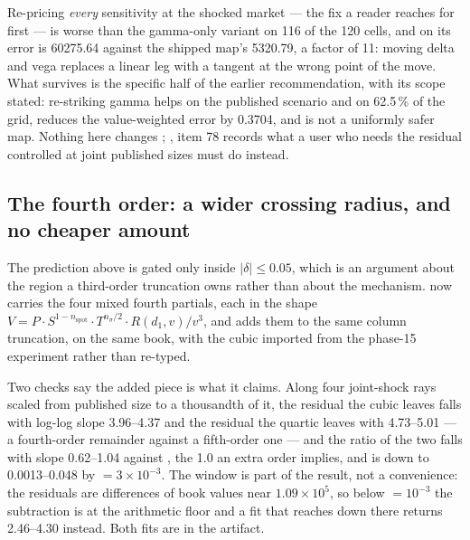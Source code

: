 \documentclass[11pt,a4paper]{article}
\begin{document}
Re-pricing \emph{every} sensitivity at the shocked market --- the fix a reader reaches for first --- is
worse than the gamma-only variant on 116 of the 120 cells, and on  its error is 60275.64
against the shipped map's 5320.79, a factor of 11: moving delta and vega replaces a linear leg with a
tangent at the wrong point of the move. What survives is the specific half of the earlier
recommendation, with its scope stated: re-striking gamma helps on the published scenario and on
62.5\,\% of the grid, reduces the value-weighted error by 0.3704, and is not a uniformly safer map.
Nothing here changes ; , item 78 records what a user who
needs the residual controlled at joint published sizes must do instead.

\subsection{The fourth order: a wider crossing radius, and no cheaper amount}
\label{sec:fourth-order}

The prediction above is gated only inside $|\delta| \le 0.05$, which is an argument about the region a
third-order truncation owns rather than about the mechanism. 
now carries the four mixed fourth partials, each in the shape
$V = P \cdot S^{1-n_{\text{spot}}} \cdot T^{n_{\sigma}/2} \cdot R(d_1, v) / v^3$, and
 adds them to the same column truncation, on the
same book, with the cubic imported from the phase-15 experiment rather than re-typed.

Two checks say the added piece is what it claims. Along four joint-shock rays scaled from published
size to a thousandth of it, the residual the cubic leaves falls with log-log slope 3.96--4.37 and the
residual the quartic leaves with 4.73--5.01 --- a fourth-order remainder against a fifth-order one ---
and the ratio of the two falls with slope 0.62--1.04 against , the 1.0 an extra order
implies, and is down to 0.0013--0.048 by  $= 3 \times 10^{-3}$. The window is part of the
result, not a convenience: the residuals are differences of book values near $1.09 \times 10^5$, so
below  $= 10^{-3}$ the subtraction is at the arithmetic floor and a fit that reaches down
there returns 2.46--4.30 instead. Both fits are in the artifact.
\end{document}
